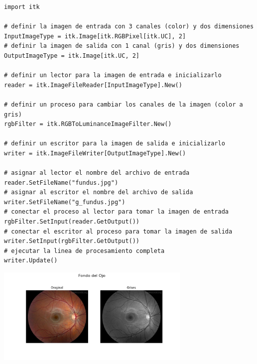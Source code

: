 \documentclass{article}
\begin{document}
\begin{lstlisting}[style=mystyle2]
import itk

# definir la imagen de entrada con 3 canales (color) y dos dimensiones
InputImageType = itk.Image[itk.RGBPixel[itk.UC], 2]
# definir la imagen de salida con 1 canal (gris) y dos dimensiones
OutputImageType = itk.Image[itk.UC, 2]

# definir un lector para la imagen de entrada e inicializarlo
reader = itk.ImageFileReader[InputImageType].New()

# definir un proceso para cambiar los canales de la imagen (color a gris)
rgbFilter = itk.RGBToLuminanceImageFilter.New()

# definir un escritor para la imagen de salida e inicializarlo
writer = itk.ImageFileWriter[OutputImageType].New()

# asignar al lector el nombre del archivo de entrada
reader.SetFileName("fundus.jpg")
# asignar al escritor el nombre del archivo de salida
writer.SetFileName("g_fundus.jpg")
# conectar el proceso al lector para tomar la imagen de entrada
rgbFilter.SetInput(reader.GetOutput())
# conectar el escritor al proceso para tomar la imagen de salida
writer.SetInput(rgbFilter.GetOutput())
# ejecutar la linea de procesamiento completa
writer.Update()

\end{lstlisting}
\begin{minipage}{\linewidth}
  \centering
  \includegraphics[width=0.7\textwidth]{imgs/fundus.png}
  \label{referenciarImagenAca}
\end{minipage}
\end{document}
